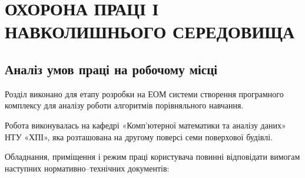 \section{ОХОРОНА ПРАЦІ І НАВКОЛИШНЬОГО СЕРЕДОВИЩА}

\subsection{Аналіз умов праці на робочому місці}

Розділ виконано для етапу розробки на ЕОМ системи створення програмного комплексу для аналізу роботи алгоритмів порівняльного навчання.

Робота виконувалась на кафедрі «Комп’ютерної математики та аналізу даних» НТУ «ХПІ», яка розташована на другому поверсі семи поверхової будівлі.

Обладнання, приміщення і режим праці користувача повинні відповідати вимогам наступних нормативно–технічних документів:

